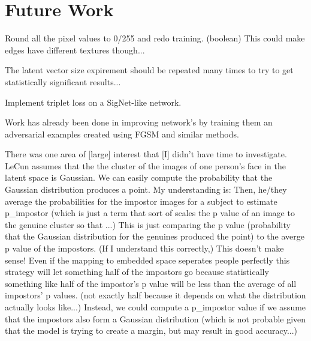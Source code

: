 \section{Future Work}\label{sec:future_work}

Round all the pixel values to 0/255 and redo training. (boolean)
    This could make edges have different textures though...

The latent vector size expirement should be repeated many times to try to get statistically significant results...

Implement triplet loss on a SigNet-like network.

Work has already been done in improving network's by training them an adversarial examples created using FGSM and similar methods.

There was one area of [large] interest that [I] didn't have time to investigate.
LeCun assumes that the the cluster of the images of one person's face in the latent space is Gaussian.
We can easily compute the probability that the Gaussian distribution produces a point.
My understanding is:
Then, he/they average the probabilities for the impostor images for a subject to estimate p\_impostor (which is just a term that sort of scales the p value of an image to the genuine cluster so that ...)
This is just comparing the p value (probability that the Gaussian distribution for the genuines produced the point) to the averge p value of the impostors.
(If I understand this correctly,) This doesn't make sense!
Even if the mapping to embedded space seperates people perfectly this strategy will let something half of the impostors go because statistically something like half of the impostor's p value will be less than the average of all impostors' p values.
(not exactly half because it depends on what the distribution actually looks like...)
Instead, we could compute a p\_impostor value if we assume that the impostors also form a Gaussian distribution (which is not probable given that the model is trying to create a margin, but may result in good accuracy...)

